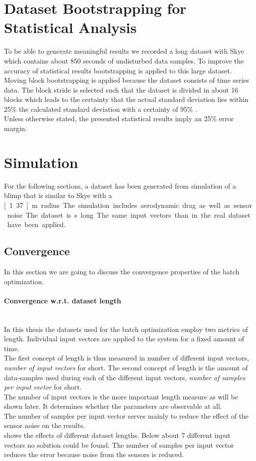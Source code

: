 \section{Dataset Bootstrapping for Statistical Analysis}
\label{sec:bootstrapping_and_statistics}
To be able to generate meaningful results we recorded a long dataset with Skye which contains about 850 seconds of undisturbed data samples.
To improve the accuracy of statistical results bootstrapping is applied to this large dataset.
Moving block bootstrapping is applied because the dataset consists of time series data.
The block stride is selected such that the dataset is divided in about 16 blocks which
leads to the certainty that the actual standard deviation lies within 25\% the calculated standard deviation with a certainty of 95\% \citep{WikiMarginOfError}. \\
Unless otherwise stated, the presented statistical results imply an 25\% error margin.

\section{Simulation}
For the following sections, a dataset has been generated from simulation of a blimp that is similar to Skye with a \unit[1.37]{m} radius.
The simulation includes aerodynamic drag as well as sensor noise.
The dataset is \unit[850]{s} long.
The same input vectors than in the real dataset have been applied.

\subsection{Convergence}
\label{sec:sim_convergence}
In this section we are going to discuss the convergence properties of the batch optimization.

\paragraph{Convergence w.r.t. dataset length} ~\\
In this thesis the datasets used for the batch optimization employ two metrics of length.
Individual input vectors are applied to the system for a fixed amount of time. \\
The first concept of length is thus measured in number of different input vectors, \textit{number of input vectors} for short.
The second concept of length is the amount of data-samples used during each of the different input vectors, \textit{number of samples per input vector} for short. \\
The number of input vectors is the more important length measure as will be shown later.
It determines whether the parameters are observable at all. \\
The number of samples per input vector serves mainly to reduce the effect of the sensor noise on the results. \\
 shows the effects of different dataset lengths.
Below about 7 different input vectors no solution could be found. 
The number of samples per input vector reduces the error because noise from the sensors is reduced.


